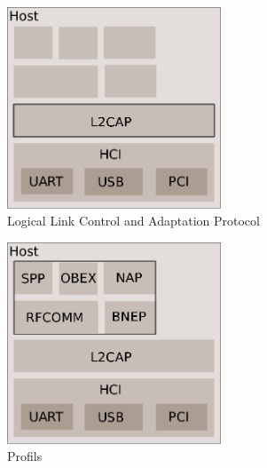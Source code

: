 \begin{frame}
\begin{figure}
\includegraphics[height=6cm]{arch_log_l2cap.png}
\caption{Logical Link Control and Adaptation Protocol}
\end{figure}
\end{frame}

\begin{frame}
\begin{figure}
\includegraphics[height=6cm]{arch_log_all.png}
\caption{Profils}
\end{figure}
\end{frame}

